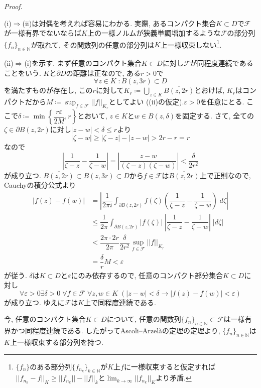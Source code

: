 \documentclass{jsarticle}
\newcommand{\N}{\mathbb{N}}%
\renewenvironment{proof}[1][Proof]{%
\begin{proofbox}%
\textit{#1. }\ignorespaces
}{%
\hfill\qedsymbol%
\end{proofbox}%
}
\begin{document}
\begin{proof}
(i)$\Rightarrow$(ii)は対偶を考えれば容易にわかる. 実際, あるコンパクト集合$K\subset D$で$\mathcal{F}$が一様有界でないならば$K$上の一様ノルムが狭義単調増加するような$\mathcal{F}$の部分列$\{f_n\}_{n\in\N}$が取れて, その関数列の任意の部分列は$K$上一様収束しない\footnote{$\{f_n\}$のある部分列$\{f_{n_{k}}\}_{k\in\N}$が$K$上$f$に一様収束すると仮定すれば$||f_{n_k}-f||_K\ge ||f_{n_k}||-||f||_k$と$\lim_{k\to\infty}||f_{n_k}||_{K}$より矛盾.}.

(ii)$\Rightarrow$(i)を示す. まず任意のコンパクト集合$K\subset D$に対し$\mathcal{F}$が同程度連続であることをいう. $K$と$\partial D$の距離は正なので, ある$r>0$で
\[
\forall z\in K\; \colon B(z, 3r)\subset D
\]
を満たすものが存在し, この$r$に対して$K_r\coloneq \bigcup_{z\in K} \overline{B(z,2r)}$とおけば, $K_r$はコンパクトだから$M\coloneq\sup_{f\in\mathcal{F}} ||f||_{K_r}$としてよい ((ii)の仮定).\:$\varepsilon>0$を任意にとる. ここで$\delta\coloneq\min\left\{\dfrac{r\varepsilon}{2M}, r\right\}$とおいて, $z\in K$と$w\in B(z, \delta)$を固定する. さて, 全ての$\zeta\in\partial B(z,2r)$に対し$|z-w|<\delta\le r$より
\[
|\zeta-w|\ge|\zeta-z|-|z-w|>2r-r=r
\]
なので
\[
\left|\dfrac{1}{\zeta-z}-\dfrac{1}{\zeta-w}\right|=\left|\dfrac{z-w}{(\zeta-z)(\zeta-w)}\right|<\dfrac{\delta}{2r^2}
\]
が成り立つ. $\overline{B(z, 2r)}\subset B(z, 3r)\subset D$から$f\in\mathcal{F}$は$\overline{B(z, 2r)}$上で正則なので, Cauchyの積分公式より
\begin{align*}
|f(z)-f(w)| & = \left|\dfrac{1}{2\pi i}\int_{\partial B(z, 2r)}f(\zeta)\left(\dfrac{1}{\zeta-z}-\dfrac{1}{\zeta-w}\right)\; d\zeta \right|\\
              & \le \dfrac{1}{2\pi}\int_{\partial B(z, 2r)}|f(\zeta)|\;\left|\dfrac{1}{\zeta-z}-\dfrac{1}{\zeta-w}\right|\; |d\zeta| \\
              & <\dfrac{2\pi\cdot 2r}{2\pi} \dfrac{\delta}{2r^2} \sup_{f\in\mathcal{F}} ||f||_{K_r}\\
              & = \dfrac{\delta}{r} M < \varepsilon
\end{align*}
が従う. $\delta$は$K\subset D$と$\varepsilon$にのみ依存するので, 任意のコンパクト部分集合$K\subset D$に対し
\[
\forall \varepsilon > 0 \exists\delta > 0\;\forall f\in\mathcal{F}\; \forall z,w \in K\; \left( |z-w|<\delta\to\left|f(z)-f(w)\right| < \varepsilon \right) 
\]
が成り立つ. ゆえに$\mathcal{F}$は$K$上で同程度連続である.

今, 任意のコンパクト集合$K\subset D$について, 任意の関数列$\{f_n\}_{n\in\N}\subset\mathcal{F}$は一様有界かつ同程度連続である. したがってAscoli–Arzelàの定理の定理より, $\{f_n\}_{n\in\N}$は$K$上一様収束する部分列を持つ.


\end{proof}
\end{document}
